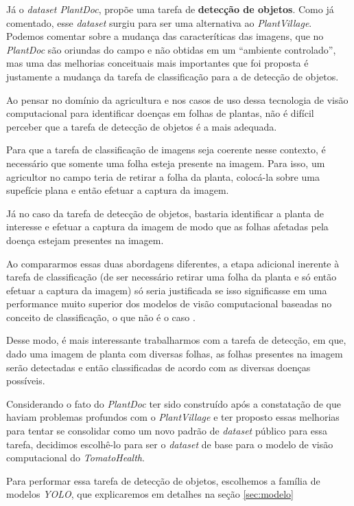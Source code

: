 Já o \emph{dataset PlantDoc}, propõe uma tarefa de {\bf detecção de objetos}. Como já comentado, esse \emph{dataset} surgiu para ser uma alternativa ao \emph{PlantVillage}. Podemos comentar sobre a mudança das caracteríticas das imagens, que no \emph{PlantDoc} são oriundas do campo e não obtidas em um ``ambiente controlado'', mas uma das melhorias conceituais mais importantes que foi proposta é justamente a mudança da tarefa de classificação para a de detecção de objetos.

Ao pensar no domínio da agricultura e nos casos de uso dessa tecnologia de visão computacional para identificar doenças em folhas de plantas, não é difícil perceber que a tarefa de detecção de objetos é a mais adequada. 

Para que a tarefa de classificação de imagens seja coerente nesse contexto, é necessário que somente uma folha esteja presente na imagem. Para isso, um agricultor no campo teria de retirar a folha da planta, colocá-la sobre uma supefície plana e então efetuar a captura da imagem.

Já no caso da tarefa de detecção de objetos, bastaria identificar a planta de interesse e efetuar a captura da imagem de modo que as folhas afetadas pela doença estejam presentes na imagem.

Ao compararmos essas duas abordagens diferentes, a etapa adicional inerente à tarefa de classificação (de ser necessário retirar uma folha da planta e só então efetuar a captura da imagem) só seria justificada se isso significasse em uma performance muito superior dos modelos de visão computacional baseadas no conceito de classificação, o que não é o caso \citep{Singh2020}.

Desse modo, é mais interessante trabalharmos com a tarefa de detecção, em que, dado uma imagem de planta com diversas folhas, as folhas presentes na imagem serão detectadas e então classificadas de acordo com as diversas doenças possíveis.

Considerando o fato do \emph{PlantDoc} ter sido construído após a constatação de que haviam problemas profundos com o \emph{PlantVillage} e ter proposto essas melhorias para tentar se consolidar como um novo padrão de \emph{dataset} público para essa tarefa, decidimos escolhê-lo para ser o \emph{dataset} de base para o modelo de visão computacional do \emph{TomatoHealth}.

Para performar essa tarefa de detecção de objetos, escolhemos a família de modelos \emph{YOLO}, que explicaremos em detalhes na seção \ref{sec:modelo}

